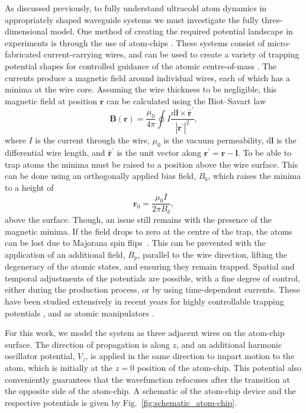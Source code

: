 As discussed previously, to fully understand ultracold atom dynamics in appropriately shaped waveguide systems we must investigate the fully three-dimensional model. One method of creating the required potential landscape in experiments is through the use of atom-chips \cite{AO:Bartenstein_ieee_2000,AO:Folman_prl_2000}. These systems consist of micro-fabricated current-carrying wires, and can be used to create a variety of trapping potential shapes for controlled guidance of the atomic centre-of-mass \cite{AO:Denschlag_prl_1999}. The currents produce a magnetic field around individual wires, each of which has a minima at the wire core. Assuming the wire thickness to be negligible, this magnetic field at position $\mathbf{r}$ can be calculated using the Biot--Savart law
\begin{equation}
    \mathbf{B}(\mathbf{r}) = \frac{\mu_0}{4\pi}\oint I \frac{\text{d}\mathbf{l}\times \hat{\mathbf{r}}^{'}}{|\mathbf{r^{'}}|^2},
\end{equation}
where $I$ is the current through the wire, $\mu_0$ is the vacuum permeability, $\text{d}\mathbf{l}$ is the differential wire length, and $\hat{\mathbf{r}}^{'}$ is the unit vector along $\mathbf{r^{'}} = \mathbf{r} - \mathbf{l}$. To be able to trap atoms the minima must be raised to a position above the wire surface. This can be done using an orthogonally applied bias field, ${B}_b$, which raises the minima to a height of
\begin{equation}
    \mathbf{r}_0 = \frac{\mu_0 I}{2\pi {B}_b},
\end{equation}
above the surface. Though, an issue still remains with the presence of the magnetic minima. If the field drops to zero at the centre of the trap, the atoms can be lost due to Majorana spin flips~\cite{AO:Brink_pra_2006}. This can be prevented with the application of an additional field, ${B}_{p}$, parallel to the wire direction, lifting the degeneracy of the atomic states, and ensuring they remain trapped. Spatial and temporal adjustments of the potentials are possible, with a fine degree of control, either during the production process, or by using time-dependent currents. These have been studied extensively in recent years for highly controllable trapping potentials \cite{AO:Yun_optexp_2006,AO:Gallego_optlett_2009}, and as atomic manipulators \cite{AO:Bensky_qip_2011}.

For this work, we model the system as three adjacent wires on the atom-chip surface. The direction of propagation is along $z$, and an additional harmonic oscillator potential, $V_z$, is applied in the same direction to impart motion to the atom, which is initially at the $z=0$ position of the atom-chip. This potential also conveniently guarantees that the wavefunction refocuses after the transition at the opposite side of the atom-chip. A schematic of the atom-chip device and the respective potentials is given by Fig.~\ref{fig:schematic_atom-chip}.

